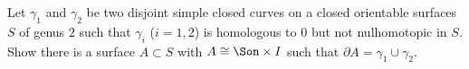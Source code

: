 Let $\gamma_1$ and $\gamma_2$ be two disjoint simple closed curves on
a closed orientable surfaces $S$ of genus $2$ such that $\gamma_i$
($i=1,2$) is homologous to $0$ but not nulhomotopic in $S$. Show there
is a surface $A\subset S$ with $A\cong \Son\times I$ such that
$\partial A=\gamma_1\cup \gamma_2$.
